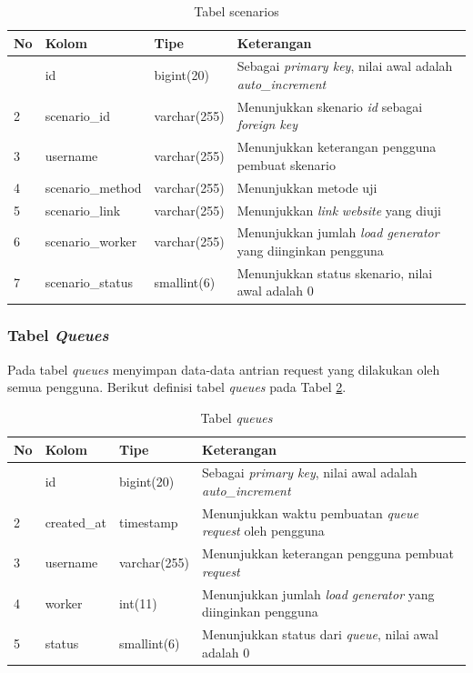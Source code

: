 				\begin{longtable}{|p{}|p{}|p{}|p{}|}
					\caption{Tabel scenarios} \label{tabelscenarios} \\
					\hline
					\textbf{No} & \textbf{Kolom} & \textbf{Tipe} & \textbf{Keterangan} \\ \hline
					\endhead
					\endfoot
					\endlastfoot
					1 & id & bigint(20) & Sebagai \textit{primary key}, nilai awal adalah \textit{auto\_increment} \\ \hline
					2 & scenario\_id & varchar(255) & Menunjukkan skenario \textit{id} sebagai \textit{foreign key} \\ \hline
					3 & username & varchar(255) & Menunjukkan keterangan pengguna pembuat skenario \\ \hline
					4 & scenario\_method & varchar(255) & Menunjukkan metode uji \\ \hline
					5 & scenario\_link & varchar(255) & Menunjukkan \textit{link} \textit{website} yang diuji \\ \hline
					6 & scenario\_worker & varchar(255) & Menunjukkan jumlah \textit{load generator} yang diinginkan pengguna \\ \hline
					7 & scenario\_status & smallint(6) & Menunjukkan status skenario, nilai awal adalah 0 \\ \hline
				\end{longtable}
		
			\subsubsection{Tabel \textit{Queues}}
				Pada tabel \textit{queues} menyimpan data-data antrian request yang dilakukan oleh semua pengguna. Berikut definisi tabel \textit{queues} pada Tabel \ref{tabelqueues}.
			
				\begin{longtable}{|p{}|p{}|p{}|p{}|}
					\caption{Tabel \textit{queues}} \label{tabelqueues} \\
					\hline
					\textbf{No} & \textbf{Kolom} & \textbf{Tipe} & \textbf{Keterangan} \\ \hline
					\endhead
					\endfoot
					\endlastfoot
					1 & id & bigint(20) & Sebagai \textit{primary key}, nilai awal adalah \textit{auto\_increment} \\ \hline
					2 & created\_at & timestamp & Menunjukkan waktu pembuatan \textit{queue} \textit{request} oleh pengguna \\ \hline
					3 & username & varchar(255) & Menunjukkan keterangan pengguna pembuat \textit{request} \\ \hline
					4 & worker & int(11) & Menunjukkan jumlah \textit{load generator} yang diinginkan pengguna \\ \hline
					5 & status & smallint(6) & Menunjukkan status dari \textit{queue}, nilai awal adalah 0 \\ \hline
				\end{longtable}
		
